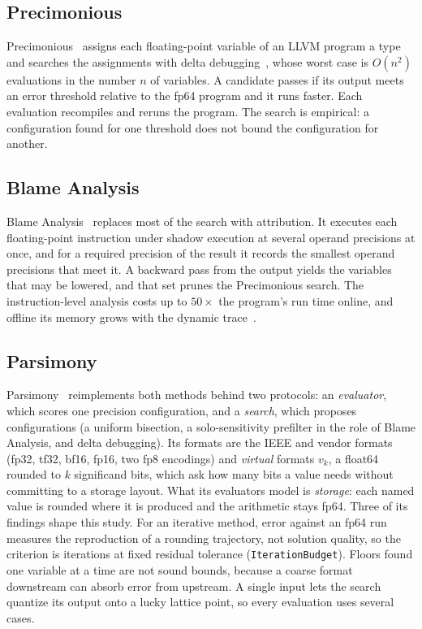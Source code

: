 \documentclass[11pt]{article}
\newcommand{\code}[1]{\texttt{#1}}
\begin{document}
\subsection{Precimonious}
Precimonious~\cite{precimonious} assigns each floating-point variable of an LLVM program a type
and searches the assignments with delta debugging~\cite{ddmin}, whose worst case is $O(n^2)$
evaluations in the number $n$ of variables.  A candidate passes if its output meets an error
threshold relative to the fp64 program and it runs faster.  Each evaluation recompiles and
reruns the program.  The search is empirical: a configuration found for one threshold does not
bound the configuration for another.

\subsection{Blame Analysis}
Blame Analysis~\cite{blame} replaces most of the search with attribution.  It executes each
floating-point instruction under shadow execution at several operand precisions at once, and
for a required precision of the result it records the smallest operand precisions that meet it.
A backward pass from the output yields the variables that may be lowered, and that set prunes
the Precimonious search.  The instruction-level analysis costs up to $50\times$ the program's
run time online, and offline its memory grows with the dynamic trace~\cite{blame}.

\subsection{Parsimony}
Parsimony~\cite{parsimony} reimplements both methods behind two protocols: an \emph{evaluator},
which scores one precision configuration, and a \emph{search}, which proposes configurations
(a uniform bisection, a solo-sensitivity prefilter in the role of Blame Analysis, and delta
debugging).  Its formats are the IEEE and vendor formats (fp32, tf32, bf16, fp16, two fp8
encodings) and \emph{virtual} formats $v_k$, a float64 rounded to $k$ significand bits, which
ask how many bits a value needs without committing to a storage layout.  What its evaluators
model is \emph{storage}: each named value is rounded where it is produced and the arithmetic
stays fp64.  Three of its findings shape this study.  For an iterative method, error against
an fp64 run measures the reproduction of a rounding trajectory, not solution quality, so the
criterion is iterations at fixed residual tolerance (\code{IterationBudget}).  Floors found one
variable at a time are not sound bounds, because a coarse format downstream can absorb error
from upstream.  A single input lets the search quantize its output onto a lucky lattice point,
so every evaluation uses several cases.
\end{document}
